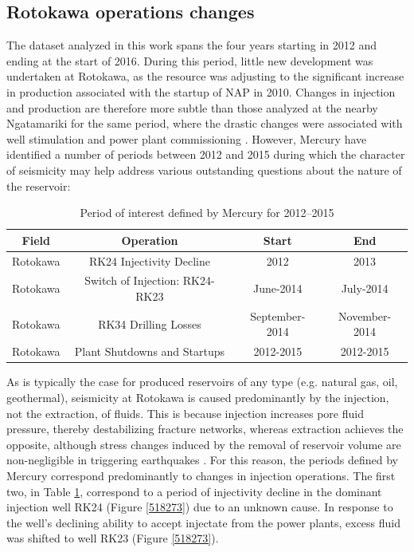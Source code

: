 \subsection{Rotokawa operations changes} \label{Plant_ops}
The dataset analyzed in this work spans the four years starting in 2012 and ending at the start of 2016. During this period, little new development was undertaken at Rotokawa, as the resource was adjusting to the significant increase in production associated with the startup of NAP in 2010. Changes in injection and production are therefore more subtle than those analyzed at the nearby Ngatamariki for the same period, where the drastic changes were associated with well stimulation and power plant commissioning \citep{Clearwater_2015}. However, Mercury have identified a number of periods between 2012 and 2015 during which the character of seismicity may help address various outstanding questions about the nature of the reservoir:
\begin{table}\label{T1}
\centering
\begin{tabular}{cccc}
    {Field} & {Operation} & {Start} & {End}\\ \midrule
    Rotokawa & RK24 Injectivity Decline & 2012 & 2013\\
    Rotokawa & Switch of Injection: RK24-RK23 & June-2014 & July-2014\\
    Rotokawa & RK34 Drilling Losses & September-2014 & November-2014\\
    Rotokawa & Plant Shutdowns and Startups & 2012-2015 & 2012-2015\\
\end{tabular}
\caption{{Period of interest defined by Mercury for 2012--2015}}
\end{table}

As is typically the case for produced reservoirs of any type (e.g. natural gas, oil, geothermal), seismicity at Rotokawa is caused predominantly by the injection, not the extraction, of fluids. This is because injection increases pore fluid pressure, thereby destabilizing fracture networks, whereas extraction achieves the opposite, although stress changes induced by the removal of reservoir volume are non-negligible in triggering earthquakes \citep{Segall_1989,2013}. For this reason, the periods defined by Mercury correspond predominantly to changes in injection operations. The first two, in Table \ref{T1}, correspond to a period of injectivity decline in the dominant injection well RK24 (Figure \ref{518273}) due to an unknown cause. In response to the well's declining ability to accept injectate from the power plants, excess fluid was shifted to well RK23 (Figure \ref{518273}).

